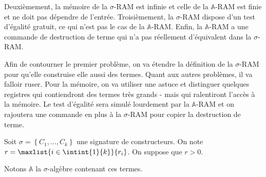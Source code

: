 \documentclass{report}
\newcommand{\bbA}{\mathbb{A}}
\begin{document}
				Deuxièmement, la mémoire de la $\sigma$-RAM est infinie et celle de la $\bbA$-RAM est finie et ne doit pas dépendre de l'entrée.
				Troisièmement, la $\sigma$-RAM dispose d'un test d'égalité gratuit, ce qui n'est pas le cas de la $\bbA$-RAM.
				Enfin, la $\bbA$-RAM a une commande de destruction de terme qui n'a pas réellement d'équivalent dans la $\sigma$-RAM. 
				
				Afin de contourner le premier problème, on va étendre la définition de la $\sigma$-RAM pour qu'elle construise elle aussi des termes. Quant aux autres problèmes, il va falloir ruser. Pour la mémoire, on va utiliser une astuce et distinguer quelques registres qui contiendront des termes très grands - mais qui ralentiront l'accès à la mémoire. Le test d'égalité sera simulé lourdement par la $\bbA$-RAM et on rajoutera une commande en plus à la $\sigma$-RAM pour copier la destruction de terme. 
				
				\espace
				
				Soit $\sigma = \left\lbrace C_1, \dots, C_k \right\rbrace$ une signature de constructeurs. On note $r = \maxlist{i \in \intint{1}{k}}{r_i}$. On suppose que $r > 0$.
				
				Notons $\bbA$ la $\sigma$-algèbre contenant ces termes.
				
\end{document}
